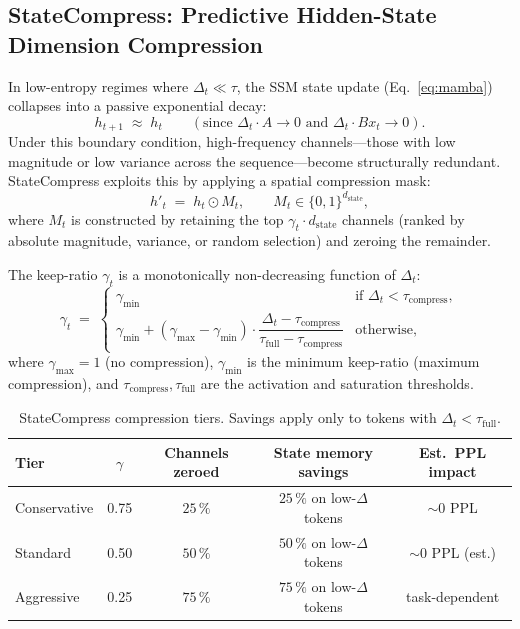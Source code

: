 \documentclass[11pt]{article}
\newcommand{\dsig}{\Delta}
\begin{document}
\subsection{StateCompress: Predictive Hidden-State Dimension Compression}
In low-entropy regimes where $\dsig_t \ll \tau$, the SSM state update
(Eq.~\ref{eq:mamba}) collapses into a passive exponential decay:
\begin{equation}\label{eq:statecompress_limit}
  h_{t+1} \;\approx\; h_t \qquad (\text{since } \dsig_t \cdot A \to 0 \text{ and } \dsig_t \cdot Bx_t \to 0).
\end{equation}
Under this boundary condition, high-frequency channels---those with low
magnitude or low variance across the sequence---become structurally
redundant. StateCompress exploits this by applying a spatial compression
mask:
\begin{equation}\label{eq:statecompress_mask}
  h'_t \;=\; h_t \odot M_t,\qquad M_t \in \{0,1\}^{d_{\mathrm{state}}},
\end{equation}
where $M_t$ is constructed by retaining the top $\gamma_t \cdot d_{\mathrm{state}}$
channels (ranked by absolute magnitude, variance, or random selection) and
zeroing the remainder.

The keep-ratio $\gamma_t$ is a monotonically non-decreasing function of
$\dsig_t$:
\begin{equation}\label{eq:statecompress_gamma}
  \gamma_t \;=\;
  \begin{cases}
    \gamma_{\min} & \text{if } \dsig_t < \tau_{\mathrm{compress}}, \\
    \gamma_{\min} + (\gamma_{\max} - \gamma_{\min}) \cdot \dfrac{\dsig_t - \tau_{\mathrm{compress}}}{\tau_{\mathrm{full}} - \tau_{\mathrm{compress}}} & \text{otherwise},
  \end{cases}
\end{equation}
where $\gamma_{\max}{=}1$ (no compression), $\gamma_{\min}$ is the minimum
keep-ratio (maximum compression), and $\tau_{\mathrm{compress}},
\tau_{\mathrm{full}}$ are the activation and saturation thresholds.

\begin{table}[H]
\centering
\small
\caption{StateCompress compression tiers. Savings apply only to tokens with
         $\dsig_t < \tau_{\mathrm{full}}$.}
\label{tab:statecompress}
\begin{tabular}{lcccc}
\toprule
Tier & $\gamma$ & Channels zeroed & State memory savings & Est.\ PPL impact \\
\midrule
Conservative & 0.75 & $25\,\%$ & $25\,\%$ on low-$\dsig$ tokens & $\sim 0$ PPL \\
Standard     & 0.50 & $50\,\%$ & $50\,\%$ on low-$\dsig$ tokens & $\sim 0$ PPL (est.) \\
Aggressive   & 0.25 & $75\,\%$ & $75\,\%$ on low-$\dsig$ tokens & task-dependent \\
\bottomrule
\end{tabular}
\end{table}
\end{document}
